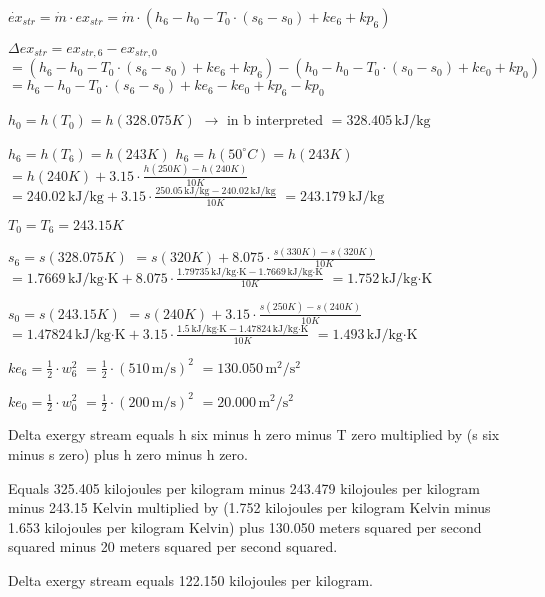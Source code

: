 \( \dot{ex}_{str} = \dot{m} \cdot ex_{str} = \dot{m} \cdot (h_6 - h_0 - T_0 \cdot (s_6 - s_0) + ke_6 + kp_6) \)  

\( \Delta ex_{str} = ex_{str,6} - ex_{str,0} \)  
\( = (h_6 - h_0 - T_0 \cdot (s_6 - s_0) + ke_6 + kp_6) - (h_0 - h_0 - T_0 \cdot (s_0 - s_0) + ke_0 + kp_0) \)  
\( = h_6 - h_0 - T_0 \cdot (s_6 - s_0) + ke_6 - ke_0 + kp_6 - kp_0 \)  

\( h_0 = h(T_0) = h(328.075K) \)  
\( \rightarrow \) in b interpreted  
\( = 328.405 \, \text{kJ/kg} \)  

\( h_6 = h(T_6) = h(243K) \)  
\( h_6 = h(50^\circ C) = h(243K) \)  
\( = h(240K) + 3.15 \cdot \frac{h(250K) - h(240K)}{10K} \)  
\( = 240.02 \, \text{kJ/kg} + 3.15 \cdot \frac{250.05 \, \text{kJ/kg} - 240.02 \, \text{kJ/kg}}{10K} \)  
\( = 243.179 \, \text{kJ/kg} \)  

\( T_0 = T_6 = 243.15K \)  

\( s_6 = s(328.075K) \)  
\( = s(320K) + 8.075 \cdot \frac{s(330K) - s(320K)}{10K} \)  
\( = 1.7669 \, \text{kJ/kg·K} + 8.075 \cdot \frac{1.79735 \, \text{kJ/kg·K} - 1.7669 \, \text{kJ/kg·K}}{10K} \)  
\( = 1.752 \, \text{kJ/kg·K} \)  

\( s_0 = s(243.15K) \)  
\( = s(240K) + 3.15 \cdot \frac{s(250K) - s(240K)}{10K} \)  
\( = 1.47824 \, \text{kJ/kg·K} + 3.15 \cdot \frac{1.5 \, \text{kJ/kg·K} - 1.47824 \, \text{kJ/kg·K}}{10K} \)  
\( = 1.493 \, \text{kJ/kg·K} \)  

\( ke_6 = \frac{1}{2} \cdot w_6^2 \)  
\( = \frac{1}{2} \cdot (510 \, \text{m/s})^2 \)  
\( = 130.050 \, \text{m}^2/\text{s}^2 \)  

\( ke_0 = \frac{1}{2} \cdot w_0^2 \)  
\( = \frac{1}{2} \cdot (200 \, \text{m/s})^2 \)  
\( = 20.000 \, \text{m}^2/\text{s}^2 \)

Delta exergy stream equals h six minus h zero minus T zero multiplied by (s six minus s zero) plus h zero minus h zero.  

Equals 325.405 kilojoules per kilogram minus 243.479 kilojoules per kilogram minus 243.15 Kelvin multiplied by (1.752 kilojoules per kilogram Kelvin minus 1.653 kilojoules per kilogram Kelvin) plus 130.050 meters squared per second squared minus 20 meters squared per second squared.  

Delta exergy stream equals 122.150 kilojoules per kilogram.